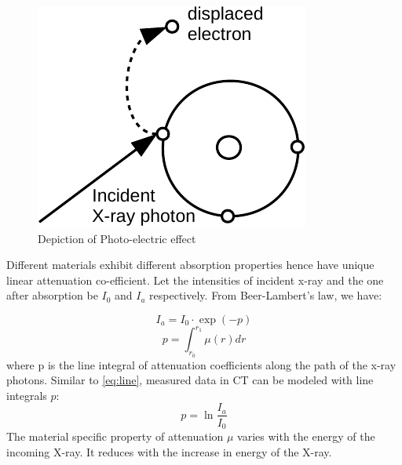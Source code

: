 \begin{figure}[!htbp]
	\centering
	\includegraphics[width=0.5\linewidth]{./Figures/photo-crop.pdf}
	\caption{Depiction of Photo-electric effect}
	\label{fig:photo}
\end{figure}


Different materials exhibit different absorption properties hence have unique linear attenuation co-efficient. Let the intensities of incident x-ray and the one after absorption be $I_{0}$ and $I_{a}$ respectively. From Beer-Lambert's law, we have:

\begin{equation}\label{eq:BL}
I_{a} = I_{0} \cdot \exp (-p) 
\end{equation}
\begin{equation}
p = \int_{r_{0}}^{r_{1}} \mu(r) dr 
\end{equation}
where p is the line integral of attenuation coefficients along the path of the x-ray photons. Similar to \ref{eq:line}, measured data in \ac{CT} can be modeled with line integrals $p$:
\begin{equation}\label{eq:l_CT}
p =\ln \frac{I_{a}}{I_{0}} 
\end{equation}
The material specific property of attenuation $\mu$ varies with the energy of the incoming X-ray. It reduces with the increase in energy of the X-ray. 

